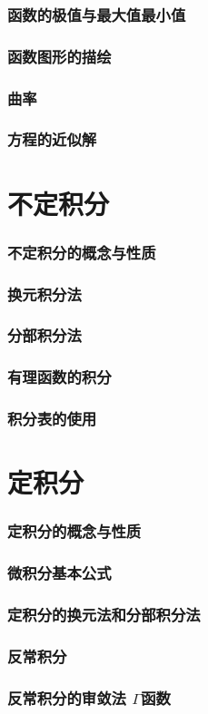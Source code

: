 \documentclass{article}
\begin{document}
  \section{函数的极值与最大值最小值}
    
  \section{函数图形的描绘}
    
  \section{曲率}
    
  \section{方程的近似解}
    

  \newpage
  \part{不定积分}
  \section{不定积分的概念与性质}
    
  \section{换元积分法}
    
  \section{分部积分法}
    
  \section{有理函数的积分}
    
  \section{积分表的使用}
    

  \newpage
  \part{定积分}
  \section{定积分的概念与性质}
    
  \section{微积分基本公式}
    
  \section{定积分的换元法和分部积分法}
    
  \section{反常积分}
    
  \section{反常积分的审敛法 $\Gamma$函数}
    
\end{document}
